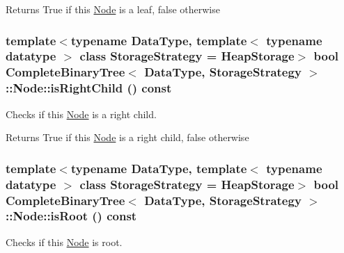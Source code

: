 \begin{DoxyReturn}{Returns}
True if this \hyperlink{class_complete_binary_tree_1_1_node}{Node} is a leaf, false otherwise 
\end{DoxyReturn}
\hypertarget{class_complete_binary_tree_1_1_node_ae30f3348baf8149b733d6d6a022d7543}{
\subsubsection[{isRightChild}]{\setlength{\rightskip}{0pt plus 5cm}template$<$typename DataType, template$<$ typename datatype $>$ class StorageStrategy = HeapStorage$>$ bool {\bf CompleteBinaryTree}$<$ DataType, StorageStrategy $>$::Node::isRightChild () const}}
\label{class_complete_binary_tree_1_1_node_ae30f3348baf8149b733d6d6a022d7543}


Checks if this \hyperlink{class_complete_binary_tree_1_1_node}{Node} is a right child. 

\begin{DoxyReturn}{Returns}
True if this \hyperlink{class_complete_binary_tree_1_1_node}{Node} is a right child, false otherwise 
\end{DoxyReturn}
\hypertarget{class_complete_binary_tree_1_1_node_aaa1aa1b75088f1d923b16405d8ef171c}{
\subsubsection[{isRoot}]{\setlength{\rightskip}{0pt plus 5cm}template$<$typename DataType, template$<$ typename datatype $>$ class StorageStrategy = HeapStorage$>$ bool {\bf CompleteBinaryTree}$<$ DataType, StorageStrategy $>$::Node::isRoot () const}}
\label{class_complete_binary_tree_1_1_node_aaa1aa1b75088f1d923b16405d8ef171c}


Checks if this \hyperlink{class_complete_binary_tree_1_1_node}{Node} is root. 

